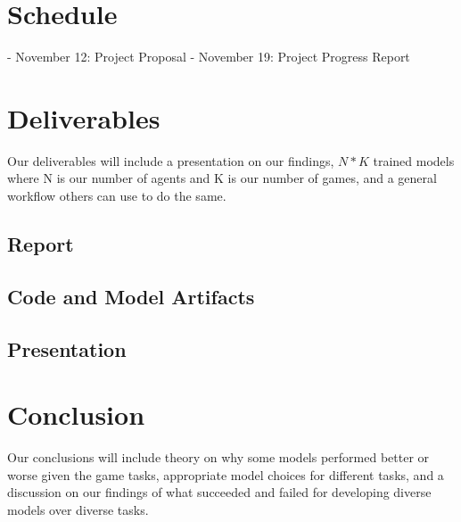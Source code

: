\documentclass[conference]{IEEEtran}
\begin{document}
\section{Schedule}
\begin{enumerate}
- November 12: Project Proposal
- November 19: Project Progress Report
\end{enumerate}

\section{Deliverables}
Our deliverables will include a presentation on our findings, $N*K$ trained models where N is our number of agents and K is our number of games, and a general workflow others can use to do the same.

\subsection{Report}

\subsection{Code and Model Artifacts}

\subsection{Presentation}

\section{Conclusion}
Our conclusions will include theory on why some models performed better or worse given the game tasks, appropriate model choices for different tasks, and a discussion on our findings of what succeeded and failed for developing diverse models over diverse tasks.

{}


\vspace{12pt}
\end{document}
